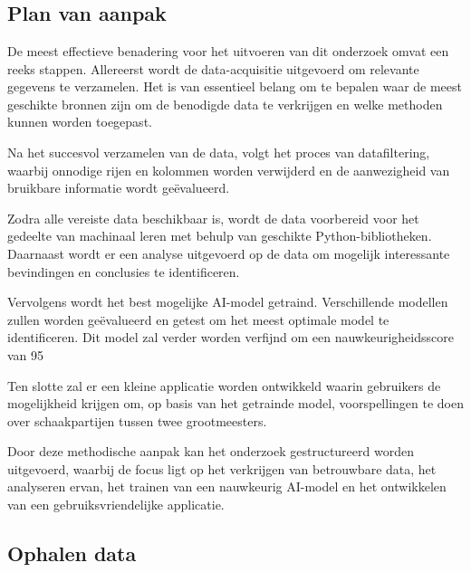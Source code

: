 
\chapter{}
\label{ch:methodologie}

\section{Plan van aanpak}


De meest effectieve benadering voor het uitvoeren van dit onderzoek omvat een reeks stappen. Allereerst wordt de data-acquisitie uitgevoerd om relevante gegevens te verzamelen. Het is van essentieel belang om te bepalen waar de meest geschikte bronnen zijn om de benodigde data te verkrijgen en welke methoden kunnen worden toegepast.

Na het succesvol verzamelen van de data, volgt het proces van datafiltering, waarbij onnodige rijen en kolommen worden verwijderd en de aanwezigheid van bruikbare informatie wordt geëvalueerd.

Zodra alle vereiste data beschikbaar is, wordt de data voorbereid voor het gedeelte van machinaal leren met behulp van geschikte Python-bibliotheken. Daarnaast wordt er een analyse uitgevoerd op de data om mogelijk interessante bevindingen en conclusies te identificeren.

Vervolgens wordt het best mogelijke AI-model getraind. Verschillende modellen zullen worden geëvalueerd en getest om het meest optimale model te identificeren. Dit model zal verder worden verfijnd om een nauwkeurigheidsscore van 95%

Ten slotte zal er een kleine applicatie worden ontwikkeld waarin gebruikers de mogelijkheid krijgen om, op basis van het getrainde model, voorspellingen te doen over schaakpartijen tussen twee grootmeesters.

Door deze methodische aanpak kan het onderzoek gestructureerd worden uitgevoerd, waarbij de focus ligt op het verkrijgen van betrouwbare data, het analyseren ervan, het trainen van een nauwkeurig AI-model en het ontwikkelen van een gebruiksvriendelijke applicatie.

\section{Ophalen data}

